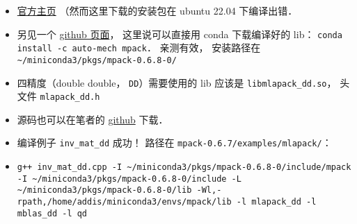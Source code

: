 
\begin{issues}
\issueDraft
\end{issues}

\begin{itemize}
\item \href{https://mplapack.sourceforge.net/}{官方主页} （然而这里下载的安装包在 ubuntu 22.04 下编译出错．
\item 另见一个 \href{https://github.com/Auto-Mech/MPACK}{github 页面}， 这里说可以直接用 conda 下载编译好的 lib： \verb|conda install -c auto-mech mpack|． 亲测有效， 安装路径在 \verb|~/miniconda3/pkgs/mpack-0.6.8-0/|
\item 四精度（double double， \verb|DD|）需要使用的 lib 应该是 \verb|libmlapack_dd.so|， 头文件 \verb|mlapack_dd.h|
\item 源码也可以在笔者的 \href{https://github.com/MacroUniverse/MPACK-source}{github} 下载．
\item 编译例子 \verb|inv_mat_dd| 成功！ 路径在 \verb|mpack-0.6.7/examples/mlapack/|：
\item \verb|g++ inv_mat_dd.cpp -I ~/miniconda3/pkgs/mpack-0.6.8-0/include/mpack -I ~/miniconda3/pkgs/mpack-0.6.8-0/include -L ~/miniconda3/pkgs/mpack-0.6.8-0/lib -Wl,-rpath,/home/addis/miniconda3/envs/mpack/lib -l mlapack_dd -l mblas_dd -l qd|
\end{itemize}

